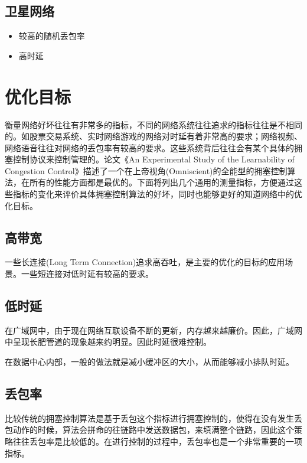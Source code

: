 \documentclass[a4paper, 12pt, UTF8]{ctexart}
\begin{document}
\subsection{卫星网络}
\begin{itemize}
	\item 较高的随机丢包率
	\item 高时延
\end{itemize}

\clearpage

\section{优化目标}
\par 衡量网络好坏往往有非常多的指标，不同的网络系统往往追求的指标往往是不相同的。如股票交易系统、实时网络游戏的网络对时延有着非常高的要求；网络视频、网络语音往往对网络的丢包率有较高的要求。这些系统背后往往会有某个具体的拥塞控制协议来控制管理的。论文《An Experimental Study of the Learnability of Congestion Control》\cite{DBLP:conf/sigcomm/SivaramanWTB14}描述了一个在上帝视角(Omniscient)的全能型的拥塞控制算法，在所有的性能方面都是最优的。下面将列出几个通用的测量指标，方便通过这些指标的变化来评价具体拥塞控制算法的好坏，同时也能够更好的知道网络中的优化目标。


\subsection{高带宽}
\par 一些长连接(Long Term Connection)追求高吞吐，是主要的优化的目标的应用场景。一些短连接对低时延有较高的要求。
\subsection{低时延}
\par 在广域网中，由于现在网络互联设备不断的更新，内存越来越廉价。因此，广域网中呈现长肥管道的现象越来约明显。因此时延很难控制。

\par 在数据中心内部，一般的做法就是减小缓冲区的大小，从而能够减小排队时延。

\subsection{丢包率}
\par 比较传统的拥塞控制算法是基于丢包这个指标进行拥塞控制的，使得在没有发生丢包动作的时候，算法会拼命的往链路中发送数据包，来填满整个链路，因此这个策略往往丢包率是比较低的。在进行控制的过程中，丢包率也是一个非常重要的一项指标。
\end{document}
